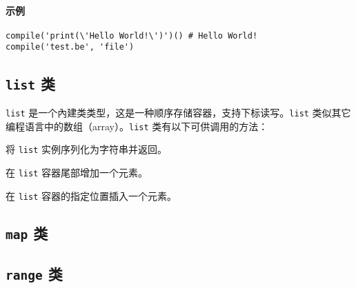 \paragraph{示例}
\begin{lstlisting}[language=berry, numbers=none]
compile('print(\'Hello World!\')')() # Hello World!
compile('test.be', 'file')
\end{lstlisting}


\subsection{\texttt{list} 类}

\texttt{list} 是一个內建类类型，这是一种顺序存储容器，支持下标读写。\texttt{list} 类似其它编程语言中的数组（array）。\texttt{list} 类有以下可供调用的方法：


将 \texttt{list} 实例序列化为字符串并返回。


在 \texttt{list} 容器尾部增加一个元素。


在 \texttt{list} 容器的指定位置插入一个元素。







\subsection{\texttt{map} 类}

\subsection{\texttt{range} 类}

